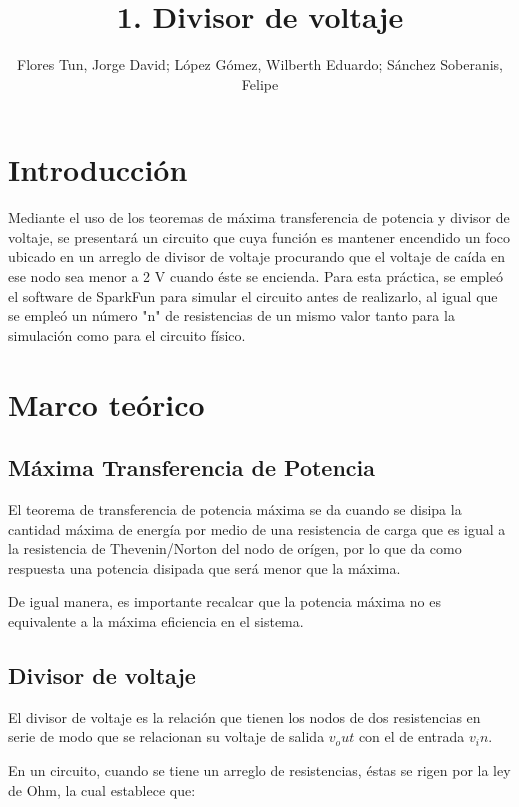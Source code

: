 \documentclass[]{article}
\title{1. Divisor de voltaje}
\author{Flores Tun, Jorge David; López Gómez, Wilberth Eduardo; Sánchez Soberanis, Felipe}
\begin{document}
\maketitle

\begin{abstract}
\end{abstract}

\section{Introducción}

Mediante el uso de los teoremas de máxima transferencia de potencia y divisor de voltaje, se presentará un circuito que cuya función es mantener encendido un foco ubicado en un 
arreglo de divisor de voltaje procurando que el voltaje de caída en ese nodo sea menor a 2 V cuando éste se encienda. Para esta práctica, se empleó el software de SparkFun para 
simular el circuito antes de realizarlo, al igual que se empleó un número "n" de resistencias de un mismo valor tanto para la simulación como para el circuito físico.

\section{Marco teórico}

\subsection{Máxima Transferencia de Potencia}

El teorema de transferencia de potencia máxima se da cuando se disipa la cantidad máxima de energía por medio de una resistencia de carga que es igual a la resistencia de Thevenin/Norton
del nodo de orígen, por lo que da como respuesta una potencia disipada que será menor que la máxima. 

De igual manera, es importante recalcar que la potencia máxima no es equivalente a la máxima eficiencia en el sistema.

\subsection{Divisor de voltaje}

El divisor de voltaje es la relación que tienen los nodos de dos resistencias en serie de modo que se relacionan su voltaje de salida $v_out$ con el de entrada $v_in$.

En un circuito, cuando se tiene un arreglo de resistencias, éstas se rigen por la ley de Ohm, la cual establece que:
\end{document}
